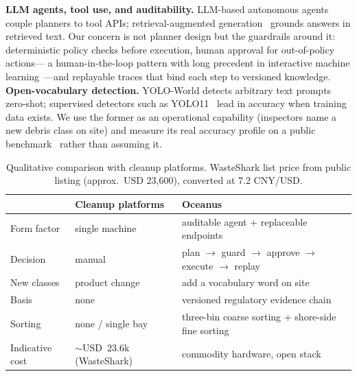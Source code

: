 \documentclass[conference]{IEEEtran}
\begin{document}
\textbf{LLM agents, tool use, and auditability.} LLM-based autonomous
agents~\cite{agentsurvey} couple planners to tool APIs; retrieval-augmented
generation~\cite{lewis} grounds answers in retrieved text. Our concern is
not planner design but the guardrails around it: deterministic policy
checks before execution, human approval for out-of-policy actions---
a human-in-the-loop pattern with long precedent in interactive machine
learning~\cite{hitl}---and replayable traces that bind each step to
versioned knowledge. \textbf{Open-vocabulary detection.} YOLO-World
\cite{yoloworld} detects arbitrary text prompts zero-shot; supervised
detectors such as YOLO11~\cite{yolo11} lead in accuracy when training data
exists. We use the former as an operational capability (inspectors name a
new debris class on site) and measure its real accuracy profile on a
public benchmark~\cite{scfloatwaste} rather than assuming it.

\begin{table}[t]
\caption{Qualitative comparison with cleanup platforms. WasteShark list
price from public listing (approx.\ USD 23,600), converted at 7.2 CNY/USD.}
\label{tab:compare}
\centering
\small
\setlength{\tabcolsep}{4pt}
\begin{tabular}{>{\raggedright\arraybackslash}p{1.75cm}
                >{\raggedright\arraybackslash}p{2.95cm}
                >{\raggedright\arraybackslash}p{3.25cm}}
\toprule
 & Cleanup platforms & Oceanus \\
\midrule
Form factor & single machine & auditable agent + replaceable endpoints \\
Decision & manual & plan $\to$ guard $\to$ approve $\to$ execute $\to$ replay \\
New classes & product change & add a vocabulary word on site \\
Basis & none & versioned regulatory evidence chain \\
Sorting & none / single bay & three-bin coarse sorting + shore-side fine sorting \\
Indicative cost & \mbox{$\sim$USD 23.6k} (WasteShark) & commodity hardware, open stack \\
\bottomrule
\end{tabular}
\end{table}
\end{document}
